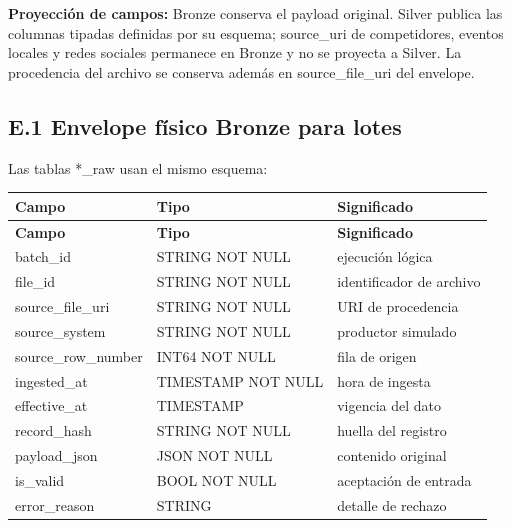 \documentclass[11pt]{article}
\begin{document}
\textbf{Proyección de campos:} Bronze conserva el payload original. Silver publica las columnas tipadas definidas por su esquema; source\_\allowbreak{}uri de competidores, eventos locales y redes sociales permanece en Bronze y no se proyecta a Silver. La procedencia del archivo se conserva además en source\_\allowbreak{}file\_\allowbreak{}uri del envelope.\par

\subsection{E.1 Envelope físico Bronze para lotes}

Las tablas *\_\allowbreak{}raw usan el mismo esquema:\par

\begingroup\small
\begin{longtable}{@{}>{\raggedright\arraybackslash}p{}>{\raggedright\arraybackslash}p{}>{\raggedright\arraybackslash}p{}@{}}
\toprule
\textbf{Campo} & \textbf{Tipo} & \textbf{Significado} \\
\midrule
\endfirsthead
\toprule
\textbf{Campo} & \textbf{Tipo} & \textbf{Significado} \\
\midrule
\endhead
batch\_\allowbreak{}id & STRING NOT NULL & ejecución lógica \\
file\_\allowbreak{}id & STRING NOT NULL & identificador de archivo \\
source\_\allowbreak{}file\_\allowbreak{}uri & STRING NOT NULL & URI de procedencia \\
source\_\allowbreak{}system & STRING NOT NULL & productor simulado \\
source\_\allowbreak{}row\_\allowbreak{}number & INT64 NOT NULL & fila de origen \\
ingested\_\allowbreak{}at & TIMESTAMP NOT NULL & hora de ingesta \\
effective\_\allowbreak{}at & TIMESTAMP & vigencia del dato \\
record\_\allowbreak{}hash & STRING NOT NULL & huella del registro \\
payload\_\allowbreak{}json & JSON NOT NULL & contenido original \\
is\_\allowbreak{}valid & BOOL NOT NULL & aceptación de entrada \\
error\_\allowbreak{}reason & STRING & detalle de rechazo \\
\bottomrule
\end{longtable}
\endgroup
\end{document}
